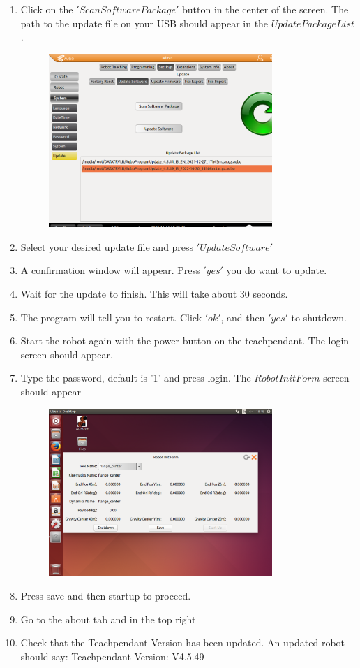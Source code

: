 \documentclass{article}
\begin{document}
\begin{enumerate}
\item Click on the $'Scan Software Package'$ button in the center of the screen. The path to the update file on your USB should appear in the $Update Package List$.
\begin{figure}[H]\centering
  \includegraphics[width=0.8\textwidth]{../../Images/lisrofUpdateFiles.png}
\end{figure}
\item Select your desired update file and press $'Update Software'$
\item A confirmation window will appear. Press $'yes'$ you do want to update.
\item Wait for the update to finish. This will take about 30 seconds. 
\item The program will tell you to restart. Click $'ok'$, and then $'yes'$ to shutdown.
\item Start the robot again with the power button on the teachpendant. The login screen should appear.
\item  Type the password, default is '1' and press login. The $Robot Init Form$ screen should appear
\begin{figure}[H]\centering
\includegraphics[width=0.8\textwidth]{../../Images/RobotInitForm.png}
\end{figure}
\item Press save and then startup to proceed.
\item Go to the about tab and in the top right
\item Check that the Teachpendant Version has been updated. An updated robot should say: Teachpendant Version: V4.5.49 
\end{enumerate}
\end{document}

